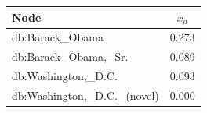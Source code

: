 \begin{figure}[htbp]
\begin{minipage}[b]{0.42\textwidth}
{\begin{tabular}{lc}
            \toprule
            \textbf{Node}  & \textbf{$x_a$} \\
            \midrule
            db:Barack\_Obama & 0.273 \\
            db:Barack\_Obama,\_Sr. & 0.089 \\
            db:Washington,\_D.C. & 0.093 \\
            db:Washington,\_D.C.\_(novel) & 0.000 \\
            \bottomrule
        \end{tabular}}
        \label{tab:example}
        \vspace{1.8cm}
	\end{minipage}
\end{figure}



